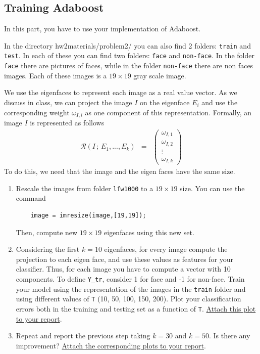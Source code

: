 \subsection{Training Adaboost}
In this part, you have to use your implementation of Adaboost.

In the directory hw2materials/problem2/ you can also find 2 folders: \texttt{train} and \texttt{test}. In each of these
you can find two folders: \texttt{face} and \texttt{non-face}. In the folder \texttt{face} there are pictures of faces, while in the
folder \texttt{non-face} there are non faces images. Each of these images is a $19 \times 19$ gray scale image.




We use the eigenfaces to represent each image as a real value vector. As we discuss in class, we can project the image $I$ on the eigenface $E_i$ and use the corresponding weight $\omega_{I,i}$ as one component of this representation. Formally, an image $I$ is represented as follows
\begin{eqnarray}
    \mathcal{R}(I \, ; \, E_1, ..., E_k) & = & \left( \begin{array}{c} \omega_{I,1} \\ \omega_{I,2} \\ \vdots \\ \omega_{I,k} \end{array} \right)
\end{eqnarray}
To do this, we need that the image and the eigen faces have the same size. 
\begin{enumerate}
    \item Rescale the images from folder \texttt{lfw1000} to a $19 \times 19$ size. You can use the command 
    \begin{lstlisting}
    image = imresize(image,[19,19]);
    \end{lstlisting}
    Then, compute new $19 \times 19$ eigenfaces using this new set.
    
    \item Considering the first $k = 10$ eigenfaces, for every image compute the projection to each eigen face, and use these values as features for your classifier. Thus, for each image you have to compute a vector with 10 components. 
    To define \texttt{Y\_tr}, consider 1 for face and -1 for non-face. Train your model using the representation of the images in the \texttt{train} folder and using different values of \texttt{T} (10, 50, 100, 150, 200). Plot your classification errors both in the training and testing set as a function of \texttt{T}. \ul{Attach this plot to your report}.

    \item Repeat and report the previous step taking $k = 30$ and $k = 50$. Is there any improvement? \ul{Attach the corresponding plots to your report}.
\end{enumerate}

